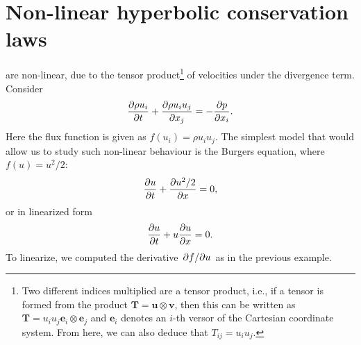 \documentclass[justified, nobib, a4page]{tufte-handout}
\begin{document}
\begin{marginfigure}
  \begin{center}
  \end{center}
  \caption{Solution to the \(a=x\) example.}\label{fig:ch6}
\end{marginfigure}

\section{Non-linear hyperbolic conservation laws}

 are non-linear, due to the 
tensor product\footnote{%
  Two different indices multiplied are a tensor product, i.e., if a tensor is
  formed from the product \(\bm{T} = \bm{u}\otimes\bm{v}\), then this can be
  written as \(\bm{T} = u_i u_j \bm{e}_i\otimes\bm{e}_j\) and \(\bm{e}_i\)
  denotes an \(i\)-th versor of the Cartesian coordinate system. From here, we 
  can also deduce that \(T_{ij}= u_i u_j\).
  }
  of velocities under the divergence term. Consider 
\[
  \pdv{\rho u_i}{t} + \pdv{\rho u_i u_j}{x_j} = -\pdv{p}{x_i}.
\]
Here the flux function is given as \(f(u_i) = \rho u_i u_j\).
The simplest model that would allow us to study such non-linear behaviour
is the Burgers equation, where \(f(u) = u^2/2\):
\begin{equation}
  \pdv{u}{t} + \pdv{u^2/2}{x} = 0,
  \label{eq:burgers}
\end{equation}
or in linearized form 
\begin{equation}
  \pdv{u}{t} + u\pdv{u}{x} = 0.
  \label{eq:lin-burgers}
\end{equation}
To linearize, we computed the derivative \(\pdv{f}/{u}\) as in the previous
example.
\end{document}
